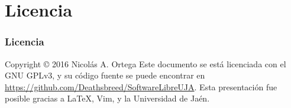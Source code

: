 \documentclass[xetex, mathserif, serif]{beamer}
\begin{document}

\section{Licencia}
\begin{frame}
    \frametitle{Licencia}
    Copyright \copyright{} 2016 Nicolás A. Ortega
    \linebreak{}
    \linebreak{}
    Este documento se está licenciada con el GNU GPLv3, y su código fuente se puede encontrar en \url{https://github.com/Deathsbreed/SoftwareLibreUJA}.
    \linebreak{}
    \linebreak{}
    Esta presentación fue posible gracias a \LaTeX, Vim, y la Universidad de Jaén.
\end{frame}
\end{document}
